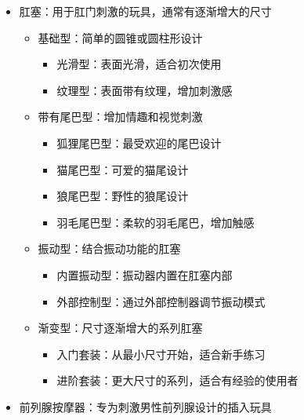 \documentclass[12pt,UTF8]{ctexbook}
\begin{document}
\begin{itemize}
\begin{itemize}
\begin{itemize}
\begin{itemize}
				\item 对称型：两端尺寸和形状相同
				\item 非对称型：两端尺寸和形状不同，满足不同需求
			\end{itemize}
			\item 玻璃型：由玻璃材质制成的假阴茎
			\begin{itemize}
				\item 透明型：透明设计，增加视觉刺激
				\item 彩色型：彩色玻璃制成，增加美观度
				\item 可加热/冷却型：可通过热水或冷水改变温度
			\end{itemize}
		\end{itemize}
		\item 肛塞：用于肛门刺激的玩具，通常有逐渐增大的尺寸
		\begin{itemize}
			\item 基础型：简单的圆锥或圆柱形设计
			\begin{itemize}
				\item 光滑型：表面光滑，适合初次使用
				\item 纹理型：表面带有纹理，增加刺激感
			\end{itemize}
			\item 带有尾巴型：增加情趣和视觉刺激
			\begin{itemize}
				\item 狐狸尾巴型：最受欢迎的尾巴设计
				\item 猫尾巴型：可爱的猫尾设计
				\item 狼尾巴型：野性的狼尾设计
				\item 羽毛尾巴型：柔软的羽毛尾巴，增加触感
			\end{itemize}
			\item 振动型：结合振动功能的肛塞
			\begin{itemize}
				\item 内置振动型：振动器内置在肛塞内部
				\item 外部控制型：通过外部控制器调节振动模式
			\end{itemize}
			\item 渐变型：尺寸逐渐增大的系列肛塞
			\begin{itemize}
				\item 入门套装：从最小尺寸开始，适合新手练习
				\item 进阶套装：更大尺寸的系列，适合有经验的使用者
			\end{itemize}
		\end{itemize}
		\item 前列腺按摩器：专为刺激男性前列腺设计的插入玩具

\end{itemize}
\end{itemize}
\end{document}
